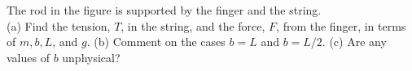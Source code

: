 The rod in the figure is supported by the finger and the string.\\
(a) Find the tension, $T$, in the string, and the force,
$F$, from the finger, in terms of $m,b,L$, and $g$.\answercheck\hwendpart
(b) Comment on the cases $b=L$ and $b=L/2$.\hwendpart
(c) Are any values of $b$ unphysical?
